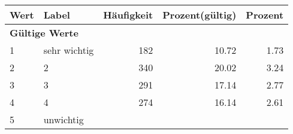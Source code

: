      \begin{longtable}{lXrrr}
     \toprule
     \textbf{Wert} & \textbf{Label} & \textbf{Häufigkeit} & \textbf{Prozent(gültig)} & \textbf{Prozent} \\
     \endhead
     \midrule
     \multicolumn{5}{l}{\textbf{Gültige Werte}}\\

     1 &
     \multicolumn{1}{X}{ sehr wichtig   } &


       \num{182} &
       \num[round-mode=places,round-precision=2]{10.72} &
         \num[round-mode=places,round-precision=2]{1.73} \\

     2 &
     \multicolumn{1}{X}{ 2   } &


       \num{340} &
       \num[round-mode=places,round-precision=2]{20.02} &
         \num[round-mode=places,round-precision=2]{3.24} \\

     3 &
     \multicolumn{1}{X}{ 3   } &


       \num{291} &
       \num[round-mode=places,round-precision=2]{17.14} &
         \num[round-mode=places,round-precision=2]{2.77} \\

     4 &
     \multicolumn{1}{X}{ 4   } &


       \num{274} &
       \num[round-mode=places,round-precision=2]{16.14} &
         \num[round-mode=places,round-precision=2]{2.61} \\

     5 &
     \multicolumn{1}{X}{ unwichtig   } &



\end{longtable}
